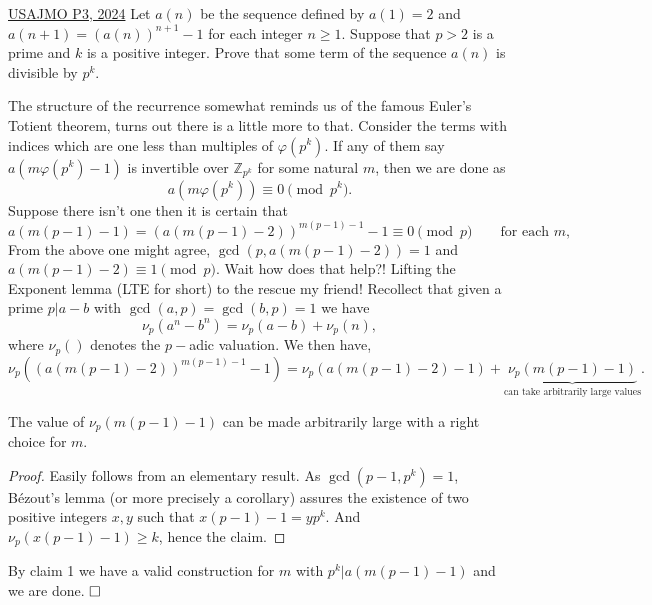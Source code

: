 \begin{problem}{2}{\href{https://artofproblemsolving.com/community/q2h3281033p34301017}{USAJMO P3, 2024}} Let $a(n)$ be the sequence defined by $a(1)=2$ and $a(n+1)=(a(n))^{n+1}-1$ for each integer $n\geq 1$. Suppose that $p>2$ is a prime and $k$ is a positive integer. Prove that some term of the sequence $a(n)$ is divisible by $p^k$.
	\begin{solution} The structure of the recurrence somewhat reminds us of the famous Euler's Totient theorem, turns out there is a little more to that. Consider the terms with indices which are one less than multiples of $\varphi(p^k)$. If any of them say $a(m\varphi(p^k)-1)$ is invertible over $\mathbb{Z}_{p^k}$ for some natural $m$, then we are done as$$a(m\varphi(p^k))\equiv 0\pmod{p^k}.$$Suppose there isn't one then it is certain that
	$$a(m(p-1)-1)= (a(m(p-1)-2))^{m(p-1)-1}-1\equiv 0\pmod{p}\qquad\text{for each $m$,}$$
	\indent From the above one might agree, $\gcd(p, a(m(p-1)-2))=1$ and $a(m(p-1)-2)\equiv 1\pmod{p}$. Wait how does that help?! Lifting the Exponent lemma (LTE for short) to the rescue my friend! Recollect that given a prime $p|a-b$ with $\gcd(a,p)=\gcd(b, p)=1$ we have
$$\nu_p(a^n-b^n)=\nu_p(a-b)+\nu_p(n),$$where $\nu_p()$ denotes the $p-$adic valuation. We then have,
$$\nu_p((a(m(p-1)-2))^{m(p-1)-1}-1) = \nu_p(a(m(p-1)-2)-1)+\underbrace{\nu_p(m(p-1)-1)}_{\text{can take arbitrarily large values}}.$$
	\begin{numclaim}{1}
	 The value of $\nu_p({m(p-1)-1})$ can be made arbitrarily large with a right choice for $m$.
	\end{numclaim}
	\begin{proof} Easily follows from an elementary result. As $\gcd(p-1,p^k)=1$, Bézout's lemma (or more precisely a corollary) assures the existence of two positive integers $x,y$ such that $x(p-1)-1=yp^k$. And $\nu_p(x(p-1)-1)\ge k$, hence the claim.
	\end{proof}

	By claim 1 we have a valid construction for $m$ with $p^k |a(m(p-1)-1)$ and we are done. $\qedwhite$	
	\end{solution}
\end{problem}

